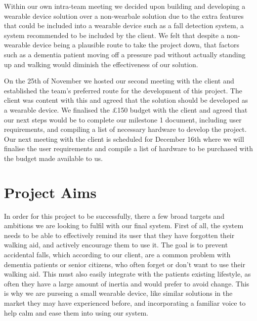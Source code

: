         Within our own intra-team meeting we decided upon building and developing a wearable device solution over a
        non-wearbale solution due to the extra features that could be included into a wearable device such as a fall
        detection system, a system recommended to be included by the client. We felt that despite a non-wearable device
        being a plausible route to take the project down, that factors such as a dementia patient moving off a pressure
        pad without actually standing up and walking would diminish the effectiveness of our solution.

        On the 25th of November we hosted our second meeting with the client and established the team's preferred route
        for the development of this project. The client was content with this and agreed that the solution should be
        developed as a wearable device. We finalised the £150 budget with the client and agreed that our next steps
        would be to complete our milestone 1 document, including user requirements, and compiling a list of necessary
        hardware to develop the project. Our next meeting with the client is scheduled for December 16th where we will
        finalise the user requirements and compile a list of hardware to be purchased with the budget made available to
        us.

    \section{Project Aims}
        In order for this project to be successfully, there a few broad targets and ambitions we are looking to fulfil
        with our final system. First of all, the system needs to be able to effectively remind its user that they have
        forgotten their walking aid, and actively encourage them to use it. The goal is to prevent accidental falls,
        which according to our client, are a common problem with dementia patients or senior citizens, who often forget
        or don't want to use their walking aid. This must also easily integrate with the patients existing lifestyle, as
        often they have a large amount of inertia and would prefer to avoid change. This is why we are purseing a small
        wearable device, like similar solutions in the market they may have experienced before, and incorporating a
        familiar voice to help calm and ease them into using our system.
